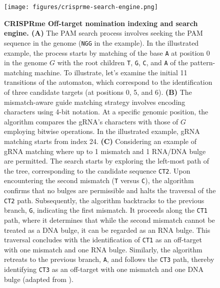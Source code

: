 \documentclass[a4paper, titlepage, openright]{book}
\newcommand{\crisprme}{CRISPRme\xspace}
\begin{document}
\begin{figure}[!]
    \centering
    \texttt{[image: figures/crisprme-search-engine.png]}
    \caption[\crisprme Off-target nomination indexing and search engine]{\textbf{\crisprme Off-target nomination indexing and search engine. (A)} The PAM search process involves seeking the PAM sequence in the genome (\texttt{NGG} in the example). In the illustrated example, the process starts by matching of the base \texttt{A} at position 0 in the genome $G$ with the root children \texttt{T}, \texttt{G}, \texttt{C}, and \texttt{A} of the pattern-matching machine. To illustrate, let's examine the initial 11 transitions of the automaton, which correspond to the identification of three candidate targets (at positions 0, 5, and 6). \textbf{(B)} The mismatch-aware guide matching strategy involves encoding characters using 4-bit notation. At a specific genomic position, the algorithm compares the gRNA's characters with those of $G$ employing bitwise operations. In the illustrated example, gRNA matching starts from index 24. \textbf{(C)} Considering an example of gRNA matching where up to 1 mismatch and 1 RNA/DNA bulge are permitted. The search starts by exploring the left-most path of the tree, corresponding to the candidate sequence \texttt{CT2}. Upon encountering the second mismatch (\texttt{T} versus \texttt{C}), the algorithm confirms that no bulges are permissible and halts the traversal of the \texttt{CT2} path. Subsequently, the algorithm backtracks to the previous branch, \texttt{G}, indicating the first mismatch. It proceeds along the \texttt{CT1} path, where it determines that while the second mismatch cannot be treated as a DNA bulge, it can be regarded as an RNA bulge. This traversal concludes with the identification of \texttt{CT1} as an off-target with one mismatch and one RNA bulge. Similarly, the algorithm retreats to the previous branch, \texttt{A}, and follows the \texttt{CT3} path, thereby identifying \texttt{CT3} as an off-target with one mismatch and one DNA bulge (adapted from \cite {cancellieri2020crispritz}).}
    \label{fig:crisprme-search-engine}
\end{figure}

\end{document}
